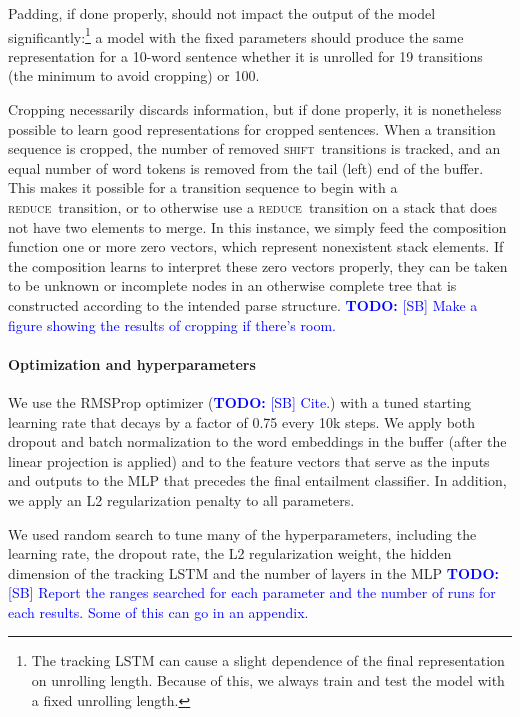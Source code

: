 \documentclass[11pt]{article}
\newcommand\todo[1]{\textcolor{blue}{\textbf{TODO:} #1}}
\newcommand{\shift}{\textsc{shift}}
\newcommand{\reduce}{\textsc{reduce}}
\begin{document}
Padding, if done properly, should not impact the output of the model significantly:\footnote{The tracking LSTM can cause a slight dependence of the final representation on unrolling length. Because of this, we always train and test the model with a fixed unrolling length.} a model with the fixed parameters should produce the same representation for a 10-word sentence whether it is unrolled for 19 transitions (the minimum to avoid cropping) or 100.

Cropping necessarily discards information, but if done properly, it is nonetheless possible to learn good representations for cropped sentences. When a transition sequence is cropped, the number of removed \shift~transitions is tracked, and an equal number of word tokens is removed from the tail (left) end of the buffer. This makes it possible for a transition sequence to begin with a \reduce~transition, or to otherwise use a \reduce~transition on a stack that does not have two elements to merge. In this instance, we simply feed the composition function one or more zero vectors, which represent nonexistent stack elements. If the composition learns to interpret these zero vectors properly, they can be taken to be unknown or incomplete nodes in an otherwise complete tree that is constructed according to the intended parse structure. \todo{[SB] Make a figure showing the results of cropping if there's room.}

\paragraph{Optimization and hyperparameters}

We use the RMSProp optimizer (\todo{[SB] Cite.}) with a tuned starting learning rate that decays by a factor of 0.75 every 10k steps. We apply both dropout \citep{srivastava2014dropout} and batch normalization \citep{2015SIoffeCSzegedy} to the word embeddings in the buffer (after the linear projection is applied) and to the feature vectors that serve as the inputs and outputs to the MLP that precedes the final entailment classifier. In addition, we apply an L2 regularization penalty to all parameters.

We used random search to tune many of the hyperparameters, including the learning rate, the dropout rate, the L2 regularization weight, the hidden dimension of the tracking LSTM and the number of layers in the MLP \todo{[SB] Report the ranges searched for each parameter and the number of runs for each results. Some of this can go in an appendix.}
\end{document}
